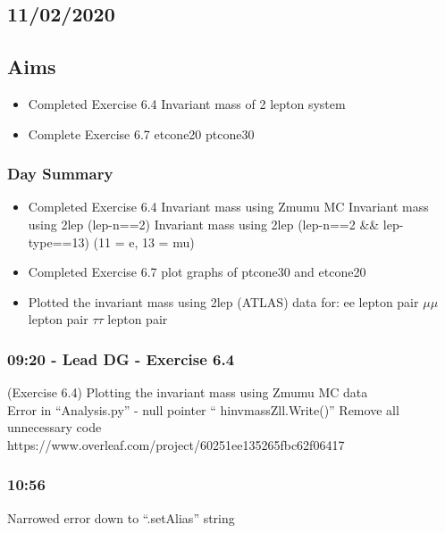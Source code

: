 \subsection*{\textbf{11/02/2020}}

\subsection{Aims}
\begin{itemize}
    \item Completed Exercise 6.4
    \subitem Invariant mass of 2 lepton system
    \item Complete Exercise 6.7
    \subitem etcone20
    \subitem ptcone30
\end{itemize}

\subsubsection{Day Summary}
\begin{itemize}
    \item Completed Exercise 6.4
    \subitem Invariant mass using Zmumu MC
    \subitem Invariant mass using 2lep (lep-n==2)
    \subitem Invariant mass using 2lep (lep-n==2 \&\& lep-type==13) (11 = e, 13 = mu)
    \subitem 
    \item Completed Exercise 6.7
    \subitem plot graphs of ptcone30 and etcone20
    \item Plotted the invariant mass using 2lep (ATLAS) data for:
    \subitem ee lepton pair 
    \subitem $\mu\mu$ lepton pair
    \subitem $\tau\tau$ lepton pair
\end{itemize}

\subsubsection*{\textbf{09:20} - Lead DG - Exercise 6.4}
(Exercise 6.4) Plotting the invariant mass using Zmumu MC data
\\
Error in “Analysis.py” - null pointer “ hinvmassZll.Write()”
Remove all unnecessary code
\\
https://www.overleaf.com/project/60251ee135265fbc62f06417

\subsubsection*{\textbf{10:56}}
Narrowed error down to “.setAlias” string

